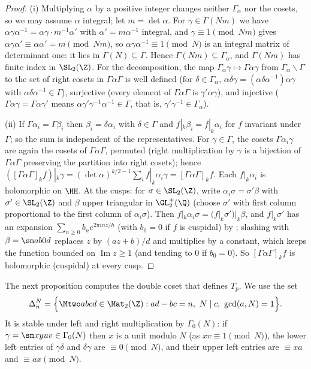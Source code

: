 \begin{proof}
(i) Multiplying $\alpha$ by a positive integer changes neither $\Gamma_\alpha$ nor the cosets, so we may assume $\alpha$ integral; let $m=\det\alpha$. For
$\gamma\in\Gamma(Nm)$ we have $\alpha\gamma\alpha^{-1}=\alpha\gamma\cdot m^{-1}\alpha'$ with $\alpha'=m\alpha^{-1}$ integral, and $\gamma\equiv1\pmod{Nm}$ gives $\alpha\gamma\alpha'\equiv\alpha\alpha'=m\pmod{Nm}$, so
$\alpha\gamma\alpha^{-1}\equiv1\pmod N$ is an integral matrix of determinant one: it lies in $\Gamma(N)\subseteq\Gamma$. Hence $\Gamma(Nm)\subseteq\Gamma_\alpha$, and $\Gamma(Nm)$ has finite
index in $\SL_2(\Z)$. For the decomposition, the map $\Gamma_\alpha\gamma\mapsto\Gamma\alpha\gamma$ from $\Gamma_\alpha\backslash\Gamma$ to the set of right cosets in $\Gamma\alpha\Gamma$ is well
defined (for $\delta\in\Gamma_\alpha$, $\alpha\delta\gamma=(\alpha\delta\alpha^{-1})\alpha\gamma$ with $\alpha\delta\alpha^{-1}\in\Gamma$), surjective (every element of $\Gamma\alpha\Gamma$ is $\gamma'\alpha\gamma$), and
injective ($\Gamma\alpha\gamma=\Gamma\alpha\gamma'$ means $\alpha\gamma'\gamma^{-1}\alpha^{-1}\in\Gamma$, that is, $\gamma'\gamma^{-1}\in\Gamma_\alpha$).

(ii) If $\Gamma\alpha_i=\Gamma\beta_i$ then $\beta_i=\delta\alpha_i$ with $\delta\in\Gamma$ and $f|_k\beta_i=f|_k\alpha_i$ for $f$ invariant under $\Gamma$; so the sum is independent of the
representatives. For $\gamma\in\Gamma$, the cosets $\Gamma\alpha_i\gamma$ are again the cosets of $\Gamma\alpha\Gamma$, permuted (right multiplication by $\gamma$ is a bijection of
$\Gamma\alpha\Gamma$ preserving the partition into right cosets); hence $([\Gamma\alpha\Gamma]_kf)|_k\gamma=(\det\alpha)^{k/2-1}\sum_if|_k\alpha_i\gamma=[\Gamma\alpha\Gamma]_kf$. Each $f|_k\alpha_i$ is
holomorphic on $\HH$. At the cusps: for $\sigma\in\SL_2(\Z)$, write $\alpha_i\sigma=\sigma'\beta$ with $\sigma'\in\SL_2(\Z)$ and $\beta$ upper triangular in $\GL_2^+(\Q)$ (choose $\sigma'$
with first column proportional to the first column of $\alpha_i\sigma$). Then $f|_k\alpha_i\sigma=(f|_k\sigma')|_k\beta$, and $f|_k\sigma'$ has an expansion
$\sum_{n\ge0}b_ne^{2\pi inz/h}$ (with $b_0=0$ if $f$ is cuspidal) by ; slashing with $\beta=\sm ab0d$ replaces $z$ by $(az+b)/d$ and multiplies by a
constant, which keeps the function bounded on $\operatorname{Im}z\ge1$ (and tending to $0$ if $b_0=0$). So $[\Gamma\alpha\Gamma]_kf$ is holomorphic (cuspidal) at every cusp.
\end{proof}

The next proposition computes the double coset that defines $T_p$. We use the set
\[
\Delta_n^N=\Bigl\{\Mtwo abcd\in\Mat_2(\Z):ad-bc=n,\ N\mid c,\ \gcd(a,N)=1\Bigr\}.
\]
It is stable under left and right multiplication by $\Gamma_0(N)$: if $\gamma=\sm xyuv\in\Gamma_0(N)$ then $x$ is a unit modulo $N$ (as $xv\equiv1\pmod N$), the lower left
entries of $\gamma\delta$ and $\delta\gamma$ are $\equiv0\pmod N$, and their upper left entries are $\equiv xa$ and $\equiv ax\pmod N$.

